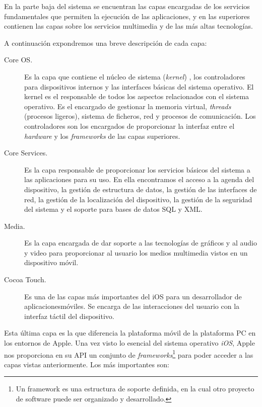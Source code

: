 En la parte baja del sistema se encuentran las capas encargadas de los
servicios fundamentales que permiten la ejecución de las aplicaciones,
y en las superiores contienen las capas sobre los servicios multimedia
y de las más altas tecnologías.
 

A continuación expondremos una breve descripción de cada capa:


\begin{description}
\item[Core OS.]  Es la capa que contiene el núcleo de
  sistema (\emph{kernel}) %
  , los controladores para dispositivos internos y las interfaces básicas del sistema
  operativo. El kernel es el responsable de todos los aspectos
  relacionados con el sistema operativo. Es el encargado de gestionar
  la memoria virtual, \emph{threads} (procesos ligeros), sistema de ficheros,
  red y procesos de comunicación. Los controladores son los encargados
  de proporcionar la interfaz entre el \emph{hardware} y los \emph{frameworks} de
  las capas superiores.
\item[Core Services.] Es la capa responsable de proporcionar los
  servicios básicos del sistema a las aplicaciones para su uso. En
  ella encontramos el acceso a la agenda del dispositivo, la gestión
  de estructura de datos, la gestión de las interfaces de red, la
  gestión de la localización del dispositivo, la gestión de la seguridad
  del sistema y el soporte para bases de datos SQL y XML.
\item[Media.] Es la capa encargada de dar soporte a las
  tecnologías de gráficos y al audio y video para proporcionar al usuario
  los medios multimedia vistos en un dispositivo móvil.
\item[Cocoa Touch.]  Es una de las capas más importantes del iOS
  para un desarrollador de aplicacionesmóviles. Se encarga de las interacciones del usuario con la interfaz táctil del dispositivo. 
 \end{description}
  
  Esta última capa es la que diferencia la plataforma móvil de la plataforma PC en los entornos de Apple. Una vez visto lo esencial del sistema operativo \emph{iOS}, Apple nos proporciona en su API un conjunto de \emph{frameworks}\footnote{Un framework es una estructura de soporte definida, en la cual otro proyecto de software puede ser organizado y desarrollado.} para poder acceder a las capas vistas anteriormente. Los más importantes son:  

